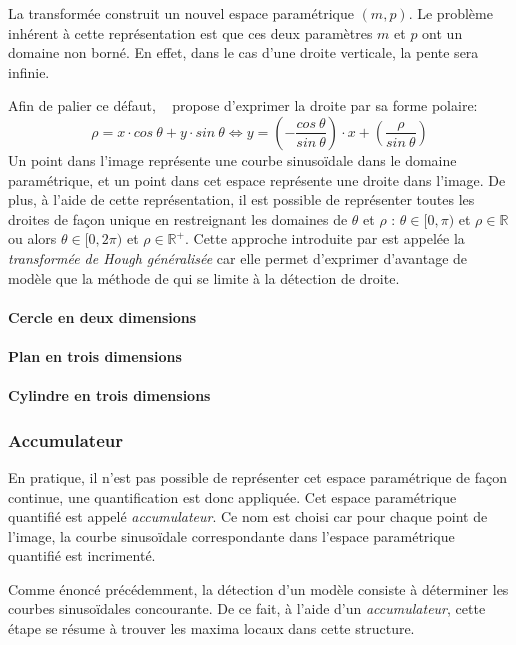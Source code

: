 La transformée construit un nouvel espace paramétrique $(m,p)$. Le problème inhérent à cette représentation est que ces deux paramètres $m$ et $p$ ont un domaine non borné. En effet, dans le cas d'une droite verticale, la pente sera infinie.

Afin de palier ce défaut, \citeauthor{Duda1972}~\cite{Duda1972} propose d'exprimer la droite par sa forme polaire:
$$\rho = x \cdot cos~\theta + y \cdot sin~\theta \Leftrightarrow y=\left(-\frac{cos~\theta}{sin~\theta}\right) \cdot x + \left(\frac{\rho}{sin~\theta}\right)$$
Un point dans l'image représente une courbe sinusoïdale dans le domaine paramétrique, et un point dans cet espace représente une droite dans l'image.
De plus, à l'aide de cette représentation, il est possible de représenter toutes les droites de façon unique en restreignant les domaines de $\theta$ et $\rho$ : $\theta \in [0, \pi)$ et $\rho \in \mathbb{R}$ ou alors $\theta \in [0, 2 \pi)$ et $\rho \in \mathbb{R}^+$. Cette approche introduite par \citeauthor{Duda1972} est appelée la \emph{transformée de Hough généralisée} car elle permet d'exprimer d'avantage de modèle que la méthode de \cite{Hough1962} qui se limite à la détection de droite.

\paragraph{Cercle en deux dimensions}
\paragraph{Plan en trois dimensions}
\paragraph{Cylindre en trois dimensions}

\subsubsection{Accumulateur}
En pratique, il n'est pas possible de représenter cet espace paramétrique de façon continue, une quantification est donc appliquée. Cet espace paramétrique quantifié est appelé \emph{accumulateur}. Ce nom est choisi car pour chaque point de l'image, la courbe sinusoïdale correspondante dans l'espace paramétrique quantifié est incrimenté.

Comme énoncé précédemment, la détection d'un modèle consiste à déterminer les courbes sinusoïdales concourante. De ce fait, à l'aide d'un \emph{accumulateur}, cette étape se résume à trouver les maxima locaux dans cette structure.

